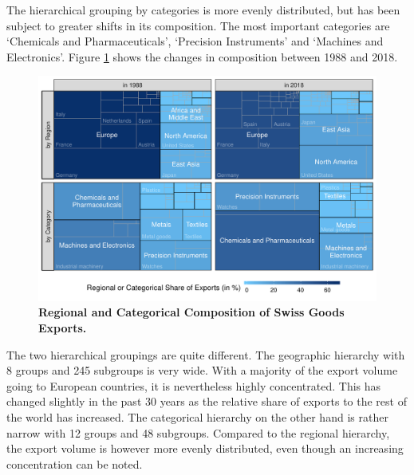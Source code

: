 \documentclass[a4paper,fleqn,11pt]{article}
\begin{document}
The hierarchical grouping by categories is more evenly distributed, but has been subject to greater shifts in its composition. The most important categories are `Chemicals and Pharmaceuticals', `Precision Instruments' and `Machines and Electronics'. Figure \ref{fig:treemap} shows the changes in composition between 1988 and 2018.
\begin{figure}[H]
	\includegraphics[width=\textwidth]{fig/fig_treemap}
	\caption[Regional and Categorical Composition of Swiss Goods Exports]{\textbf{Regional and Categorical Composition of Swiss Goods Exports.}}\label{fig:treemap}
\end{figure}
The two hierarchical groupings are quite different. The geographic hierarchy with 8 groups and 245 subgroups is very wide. With a majority of the export volume going to European countries, it is nevertheless highly concentrated. This has changed slightly in the past 30 years as the relative share of exports to the rest of the world has increased. The categorical hierarchy on the other hand is rather narrow with 12 groups and 48 subgroups. Compared to the regional hierarchy, the export volume is however more evenly distributed, even though an increasing concentration can be noted.\\
\end{document}
